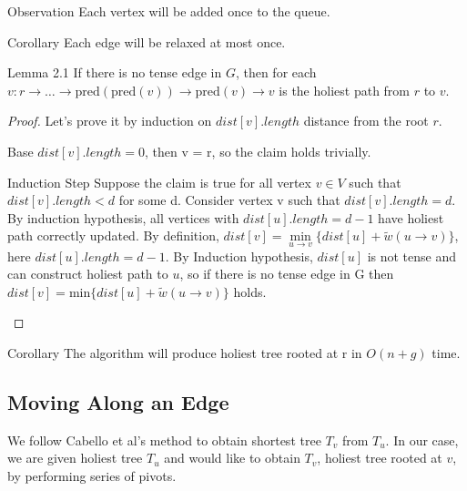 \documentclass{article}
\begin{document}
\vspace{0.5cm}

\begin{oneshot}{Observation}
Each vertex will be added once to the queue.
\end{oneshot}

\begin{oneshot}{Corollary}
Each edge will be relaxed at most once.
\end{oneshot}

\begin{oneshot}{Lemma 2.1}
If there is no tense edge in $G$, then for each 
$v: r \rightarrow \ldots \rightarrow \text{pred}(\text{pred}(v)) \rightarrow 
\text{pred}(v) \rightarrow v$ is the holiest path from $r$ to $v$.
\end{oneshot}
\begin{proof}
Let's prove it by induction on $dist[v].length$ distance from the root
$r$.
\begin{oneshot}{Base}
$dist[v].length = 0$, then v = r, so the claim holds trivially.
\end{oneshot}

\begin{oneshot}{Induction Step}
Suppose the claim is true for all vertex $v \in V$ 
such that $dist[v].length < d$ for some d. Consider vertex v such that 
$dist[v].length=d$. By induction hypothesis, all vertices with 
$dist[u].length = d-1$ have holiest path 
correctly updated. By definition, $dist[v] = \min\limits_{u \rightarrow v}\{
dist[u] + \tilde w(u \rightarrow v)\}$, here $dist[u].length = d-1$. 
By Induction hypothesis, $dist[u]$ is not tense and can construct holiest 
path to $u$, so if there is no tense edge in G then 
$dist[v] = \text{min}\{dist[u] + \tilde w(u \rightarrow v)\}$ 
holds.
\end{oneshot}
\end{proof}

\begin{oneshot}{Corollary}
The algorithm will produce holiest tree rooted at r in $O(n + g)$ time.
\end{oneshot}

\subsection{Moving Along an Edge}

We follow Cabello et al's \cite{cabello2013multiple}
method to obtain shortest tree $T_v$ from $T_u$. In our case, we are given holiest tree $T_u$ and would like to obtain $T_v$, holiest tree rooted at $v$, by performing series of pivots.\\
\end{document}
